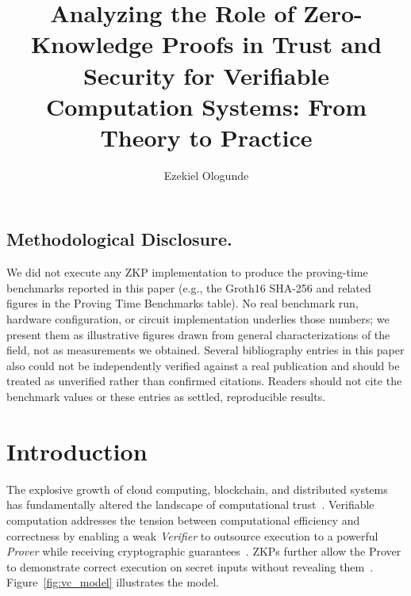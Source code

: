 \documentclass[sigconf,nonacm]{acmart}
\title{Analyzing the Role of Zero-Knowledge Proofs in Trust and Security for
Verifiable Computation Systems: From Theory to Practice}
\author{Ezekiel Ologunde}
\affiliation{\institution{Independent Researcher}\city{Boston}\state{MA}\country{USA}}
\begin{document}
\maketitle

\subsection*{Methodological Disclosure.}
We did not execute any ZKP implementation to produce the proving-time
benchmarks reported in this paper (e.g., the Groth16 SHA-256 and related
figures in the Proving Time Benchmarks table). No real benchmark run,
hardware configuration, or circuit implementation underlies those numbers;
we present them as illustrative figures drawn from general characterizations
of the field, not as measurements we obtained. Several bibliography entries
in this paper also could not be independently verified against a real
publication and should be treated as unverified rather than confirmed
citations. Readers should not cite the benchmark values or these entries as
settled, reproducible results.

\section{Introduction}

The explosive growth of cloud computing, blockchain, and distributed systems has
fundamentally altered the landscape of computational
trust~\cite{trust_evolution_2023,distributed_trust_2024}. Verifiable computation
addresses the tension between computational efficiency and correctness by enabling a
weak \textit{Verifier} to outsource execution to a powerful \textit{Prover} while
receiving cryptographic guarantees~\cite{vc_foundations_2022}. ZKPs further allow the
Prover to demonstrate correct execution on secret inputs without revealing
them~\cite{witness_privacy_2023}. Figure~\ref{fig:vc_model} illustrates the model.
\end{document}
